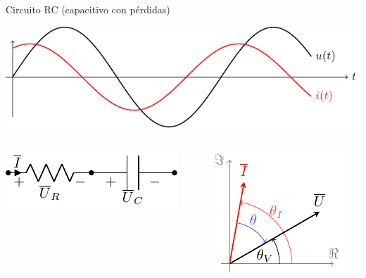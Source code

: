 \documentclass[xcolor={usenames,svgnames,dvipsnames}]{beamer}
\begin{document}
\begin{frame}[label={sec:org3deec69}]{Circuito RC (capacitivo con pérdidas)}
\begin{center}
\includegraphics[height=0.25\textheight]{figs/capacitivo.pdf}
\end{center}


\begin{columns}
\begin{column}{0.45\columnwidth}
\begin{center}
\includegraphics[width=.9\linewidth]{figs/RC.pdf}
\end{center}
\end{column}

\begin{column}{0.55\columnwidth}
\begin{center}
\includegraphics[height=0.45\textheight]{figs/fasorCondensadorReal_VI.pdf}
\end{center}
\end{column}
\end{columns}
\end{frame}
\end{document}
